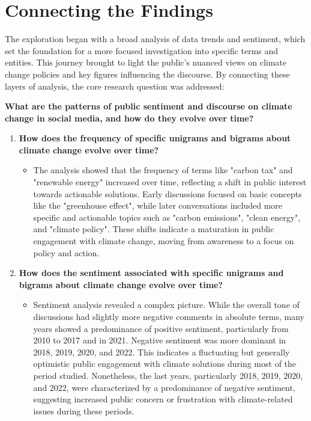 \section{Connecting the Findings}
The exploration began with a broad analysis of data trends and sentiment, which set the foundation for a more focused investigation into specific terms and entities. This journey brought to light the public's nuanced views on climate change policies and key figures influencing the discourse. By connecting these layers of analysis, the core research question was addressed:


\textbf{What are the patterns of public sentiment and discourse on climate change in social media, and how do they evolve over time?}
\begin{enumerate}
    \item \textbf{How does the frequency of specific unigrams and bigrams about climate change evolve over time?}
    \begin{itemize}
        \item The analysis showed that the frequency of terms like "carbon tax" and "renewable energy" increased over time, reflecting a shift in public interest towards actionable solutions. Early discussions focused on basic concepts like the "greenhouse effect", while later conversations included more specific and actionable topics such as "carbon emissions", "clean energy", and "climate policy". These shifts indicate a maturation in public engagement with climate change, moving from awareness to a focus on policy and action.
    \end{itemize} 
    \item \textbf{How does the sentiment associated with specific unigrams and bigrams about climate change evolve over time?}
    \begin{itemize}
        \item Sentiment analysis revealed a complex picture. While the overall tone of discussions had slightly more negative comments in absolute terms, many years showed a predominance of positive sentiment, particularly from 2010 to 2017 and in 2021. Negative sentiment was more dominant in 2018, 2019, 2020, and 2022. This indicates a fluctuating but generally optimistic public engagement with climate solutions during most of the period studied. Nonetheless, the last years, particularly 2018, 2019, 2020, and 2022, were characterized by a predominance of negative sentiment, suggesting increased public concern or frustration with climate-related issues during these periods.
    \end{itemize}
\end{enumerate}

